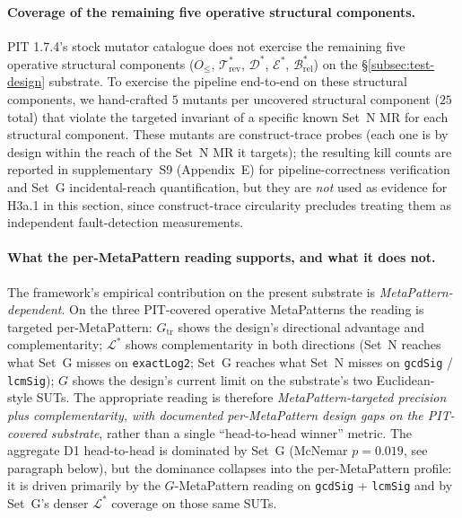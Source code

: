 \documentclass[acmsmall,screen,review]{acmart}
\begin{document}
\paragraph{Coverage of the remaining five operative structural components.}
\label{para:augmented-stratum-pointer}
PIT 1.7.4's stock mutator catalogue does not exercise the remaining
five operative structural components ($O_{\le}$, $\mathcal{T}^{*}_{\mathrm{rev}}$,
$\mathcal{D}^{*}$, $\mathcal{E}^{*}$,
$\mathcal{B}^{*}_{\mathrm{rel}}$) on the
\S\ref{subsec:test-design} substrate. To exercise the pipeline
end-to-end on these structural components, we hand-crafted $5$ mutants per
uncovered structural component ($25$ total) that violate the targeted invariant of
a specific known Set~N MR for each structural component. These mutants are
construct-trace probes (each one is by design within the reach of
the Set~N MR it targets); the resulting kill counts are reported in
supplementary~S9 (Appendix~E) for pipeline-correctness
verification and Set~G incidental-reach quantification, but they are
\emph{not} used as evidence for H3a.1 in this section, since
construct-trace circularity precludes treating them as independent
fault-detection measurements.

\paragraph{What the per-MetaPattern reading supports, and what it does not.}
The framework's empirical contribution on the present substrate is
\emph{MetaPattern-dependent}. On the three PIT-covered operative MetaPatterns
the reading is targeted per-MetaPattern: $G_{\mathrm{tr}}$ shows the
design's directional advantage and complementarity; $\mathcal{L}^{*}$
shows complementarity in both directions (Set~N reaches what Set~G
misses on \texttt{exactLog2}; Set~G reaches what Set~N misses on
\texttt{gcdSig} / \texttt{lcmSig}); $G$ shows the design's current
limit on the substrate's two Euclidean-style SUTs. The appropriate
reading is therefore \emph{MetaPattern-targeted precision plus
complementarity, with documented per-MetaPattern design gaps on the
PIT-covered substrate}, rather than a single ``head-to-head winner''
metric. The aggregate D1 head-to-head is dominated by Set~G
(McNemar $p = 0.019$, see paragraph below), but the dominance
collapses into the per-MetaPattern profile: it is driven primarily by the
$G$-MetaPattern reading on \texttt{gcdSig} + \texttt{lcmSig} and by Set~G's
denser $\mathcal{L}^{*}$ coverage on those same SUTs.
\end{document}
